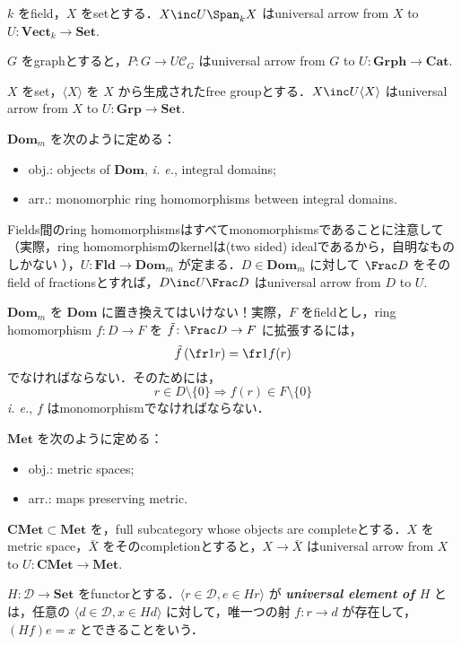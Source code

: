 \documentclass{naughieLuatex}
\newcommand\cat\mathscr
\renewcommand\defterm[1]{ \textbf{\emph{#1}} }
\newcommand\opair[2]{\langle #1, #2 \rangle}
\newcommand\ext\tilde
\newcommand\genby[1]{\langle #1 \rangle}
\newcommand\thatis{\emph{i. e.}}
\newcommand\catb\mathbf
\newcommand\Vect{\catb{Vect}}
\newcommand\Set{\catb{Set}}
\newcommand\Grp{\catb{Grp}}
\newcommand\Grph{\catb{Grph}}
\newcommand\Cat{\catb{Cat}}
\newcommand\Dom{\catb{Dom}}
\newcommand\Fld{\catb{Fld}}
\newcommand\Met{\catb{Met}}
\newcommand\CMet{\catb{CMet}}
\begin{document}
\begin{exs}
\item $k$ をfield，$X$ をsetとする．$X \inc U \Span_k X$ はuniversal arrow from $X$ to $U \colon \Vect_k \to \Set$.
\item $G$ をgraphとすると，$P \colon G \to U \cat C_G$ はuniversal arrow from $G$ to $U \colon \Grph \to \Cat$.
\item $X$ をset，$\genby X$ を $X$ から生成されたfree groupとする．$X \inc U \genby X$ はuniversal arrow from $X$ to $U \colon \Grp \to \Set$.
\item $\Dom_m$ を次のように定める：
  \begin{itemize}
    \item obj.: objects of $\Dom$, \thatis, integral domains;
    \item arr.: monomorphic ring homomorphisms between integral domains.
  \end{itemize}
  Fields間のring homomorphismsはすべてmonomorphismsであることに注意して（実際，ring homomorphismのkernelは(two sided) idealであるから，自明なものしかない ），$U \colon \Fld \to \Dom_m$ が定まる．$D \in \Dom_m$ に対して $\Frac D$ をそのfield of fractionsとすれば，$D \inc U \Frac D$ はuniversal arrow from $D$ to $U$.
  \begin{rem}
    $\Dom_m$ を $\Dom$ に置き換えてはいけない！実際，$F$ をfieldとし，ring homomorphism $f \colon D \to F$ を $\ext f \colon \Frac D \to F$ に拡張するには，
    \[
      \ext f \left( \fr 1r \right) = \fr 1{f (r)}
    \]
    でなければならない．そのためには，
    \[
      r \in D \setminus \{0\} \Longrightarrow f (r) \in F \setminus \{0\}
    \]
    \thatis, $f$ はmonomorphismでなければならない．
  \end{rem}
\item $\Met$ を次のように定める：
  \begin{itemize}
    \item obj.: metric spaces;
    \item arr.: maps preserving metric.
  \end{itemize}
  $\CMet \subset \Met$ を，full subcategory whose objects are completeとする．$X$ をmetric space，$\bar X$ をそのcompletionとすると，$X \to \bar X$ はuniversal arrow from $X$ to $U \colon \CMet \to \Met$.
\end{exs}

\begin{define}
  $H \colon \cat D \to \Set$ をfunctorとする．$\opair{r \in \cat D}{e \in H r}$ が\defterm{universal element of $H$}とは，任意の $\opair{d \in \cat D}{x \in H d}$ に対して，唯一つの射 $f \colon r \to d$ が存在して，$(H f) e = x$ とできることをいう．
\end{define}
\end{document}
